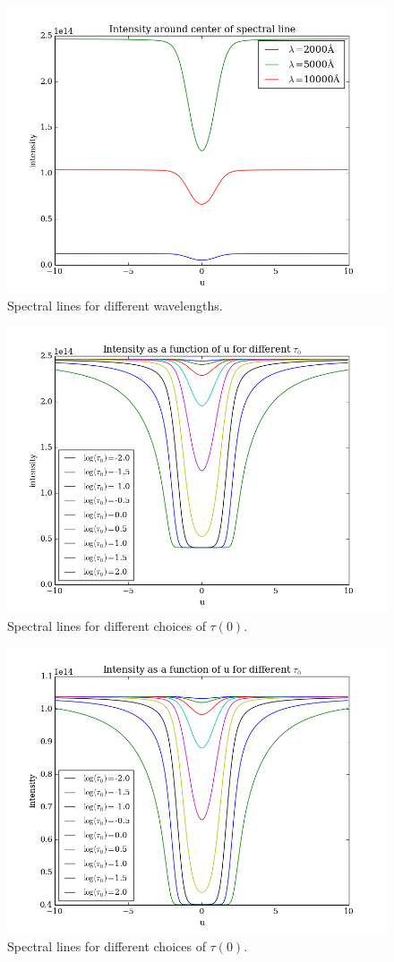 \documentclass{aa}   %
\begin{document}
\begin{figure}
 \includegraphics[width=.49\textwidth]{emergent_line_orig.png}
 \caption{Spectral lines for different wavelengths.}
 \label{emergent_line_orig}
\end{figure}
\begin{figure}
 \includegraphics[width=.49\textwidth]{emergent_line_log_5000.png}
 \caption{Spectral lines for different choices of $\tau(0)$.}
 \label{emergent_line_log_5000} 
\end{figure}
\begin{figure}
 \includegraphics[width=.49\textwidth]{emergent_line_log_10000.png}
 \caption{Spectral lines for different choices of $\tau(0)$.}
 \label{emergent_line_log_10000} 
\end{figure}
\end{document}
